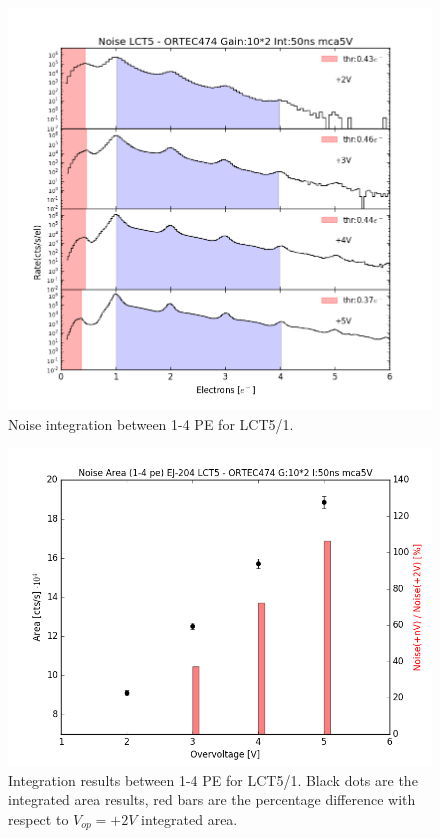 \documentclass[10pt,a4paper, openany]{book}
\begin{document}
\newpage

\begin{figure}[!h]
\begin{center}
\includegraphics[scale=0.45]{imm/noise_lct5_int.png}
\end{center}
\caption{Noise integration between 1-4 PE for LCT5/1.} 
\label{fig:noise_lct5_int}
\end{figure} 

\begin{figure}[!h]
\begin{center}
\includegraphics[scale=0.45]{imm/noise_lct5_area.png}
\end{center}
\caption{Integration results between 1-4 PE for LCT5/1. Black dots are the integrated area results, red bars are the percentage difference with respect to $V_{op}=+2V$ integrated area.} 
\label{fig:noise_lct5_area}
\end{figure} 
\end{document}
